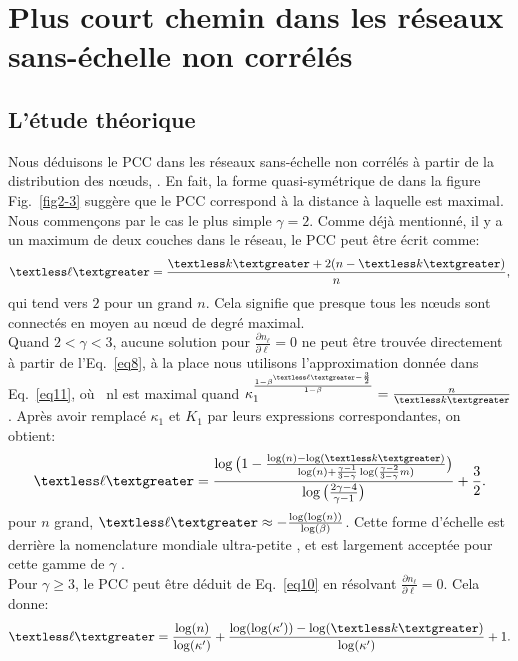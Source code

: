 \section{Plus court chemin dans les réseaux sans-échelle non corrélés }
   \subsection{L'étude théorique}
   \label{pcc}
   Nous déduisons le PCC dans les réseaux sans-échelle non corrélés à partir de la distribution des nœuds, \nl. En fait, la forme quasi-symétrique de \nl dans la figure Fig.~\ref{fig2-3} suggère que le PCC correspond à la distance à laquelle \nl est maximal. \\ Nous commençons par le cas le plus simple $\gamma=2$. Comme déjà mentionné, il y a un maximum de deux couches dans le réseau, le PCC peut être écrit comme:
   \begin{align}
   	\textless \ell \textgreater=\frac{\km+2(n-\km)}{n},
   	\label{eq14}  
   \end{align}
qui tend vers $2$ pour un grand $n$. Cela signifie que presque tous les nœuds sont connectés en moyen au nœud de degré maximal. \\
Quand $ 2<\gamma<3 $, aucune solution pour $\frac{\partial n_{\ell}}{\partial\ell}=0$ ne peut être trouvée directement à partir de l'Eq.~\eqref{eq8}, à la place nous utilisons l'approximation donnée dans Eq.~\eqref{eq11}, où \ nl est maximal quand $\kappa_1^{\frac{1-\beta^{\textless \ell \textgreater-\frac{3}{2}}}{1-\beta}}=\frac{n}{\km}$. Après avoir remplacé $\kappa_1 $ et $K_1$ par leurs expressions correspondantes, on obtient:
\begin{align}
	\textless \ell \textgreater=\frac{\log\big(1-\frac{\log(n)-\log(\km)}{\log(n)+\frac{\gamma-1}{3-\gamma}\log(\frac{\gamma-2}{3-\gamma}m)}\big)}{\log\big(\frac{2\gamma-4}{\gamma-1}\big)}+\frac{3}{2}.
	\label{eq12}
\end{align}
pour $n$ grand, $\textless \ell \textgreater \approx -\frac{\log(\log(n))}{\log(\beta)}$.
Cette forme d'échelle est derrière la nomenclature mondiale ultra-petite \cite{Cohen-Havlin2003}, et est largement acceptée pour cette gamme de $\gamma $ \cite{Do-al2003,Cohen-al2002,Chung-Lu2002,Fox-Bellwood2014,Hofstad-al2014}.\\
Pour $\gamma\ge 3 $, le PCC peut être déduit de Eq.~\eqref{eq10} en résolvant $\frac{\partial n_{\ell}}{\partial\ell}=0$. Cela donne:
\begin{align}
	\textless \ell \textgreater=\frac{\log (n)}{\log(\kappa')}+\frac{\log(\log(\kappa'))-\log(\km)}{\log(\kappa')}+1.
	\label{eq13}
\end{align}

